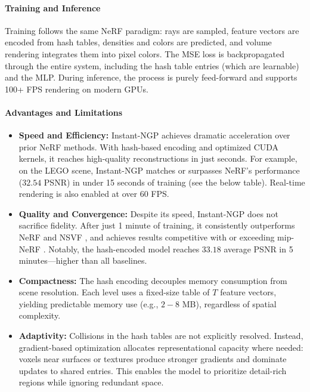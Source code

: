 \begin{enrichment}
\begin{enrichment}
    \paragraph{Training and Inference}
    Training follows the same NeRF paradigm: rays are sampled, feature vectors are encoded from hash tables, densities and colors are predicted, and volume rendering integrates them into pixel colors. The MSE loss is backpropagated through the entire system, including the hash table entries (which are learnable) and the MLP. During inference, the process is purely feed-forward and supports 100+ FPS rendering on modern GPUs.
    
    \newpage
    \paragraph{Advantages and Limitations}
    
    \begin{itemize}
        \item \textbf{Speed and Efficiency:} Instant-NGP achieves dramatic acceleration over prior NeRF methods. With hash-based encoding and optimized CUDA kernels, it reaches high-quality reconstructions in just seconds. For example, on the LEGO scene, Instant-NGP matches or surpasses NeRF’s performance (\(32.54\) PSNR) in under 15 seconds of training (see the below table). Real-time rendering is also enabled at over 60 FPS.
        
        \item \textbf{Quality and Convergence:} Despite its speed, Instant-NGP does not sacrifice fidelity. After just 1 minute of training, it consistently outperforms NeRF \cite{mildenhall2020_nerf} and NSVF \cite{liu2020_nsvf}, and achieves results competitive with or exceeding mip-NeRF \cite{barron2021_mipnerf}. Notably, the hash-encoded model reaches \(33.18\) average PSNR in 5 minutes—higher than all baselines.
        
        \item \textbf{Compactness:} The hash encoding decouples memory consumption from scene resolution. Each level uses a fixed-size table of \( T \) feature vectors, yielding predictable memory use (e.g., \(2-8\) MB), regardless of spatial complexity.
        
        \item \textbf{Adaptivity:} Collisions in the hash tables are not explicitly resolved. Instead, gradient-based optimization allocates representational capacity where needed: voxels near surfaces or textures produce stronger gradients and dominate updates to shared entries. This enables the model to prioritize detail-rich regions while ignoring redundant space.
        

\end{itemize}
\end{enrichment}
\end{enrichment}
